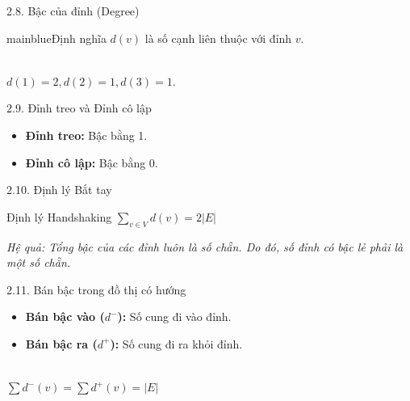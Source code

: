 \documentclass[10pt, xcolor={dvipsnames}]{beamer}
\begin{document}
\begin{frame}{2.8. Bậc của đỉnh (Degree)}
    \begin{detailbox}{mainblue}{Định nghĩa}
        $d(v)$ là số cạnh liên thuộc với đỉnh $v$.
    \end{detailbox}
    \centering
    \\ $d(1)=2, d(2)=1, d(3)=1$.
\end{frame}

\begin{frame}{2.9. Đỉnh treo và Đỉnh cô lập}
    \begin{itemize}
        \item \textbf{Đỉnh treo:} Bậc bằng 1.
        \item \textbf{Đỉnh cô lập:} Bậc bằng 0.
    \end{itemize}
    \centering
\end{frame}

\begin{frame}{2.10. Định lý Bắt tay}
    \begin{alertblock}{Định lý Handshaking}
        $\sum_{v \in V} d(v) = 2|E|$
    \end{alertblock}
    \vspace{0.3cm}
    \textit{Hệ quả: Tổng bậc của các đỉnh luôn là số chẵn. Do đó, số đỉnh có bậc lẻ phải là một số chẵn.}
\end{frame}

\begin{frame}{2.11. Bán bậc trong đồ thị có hướng}
    \begin{itemize}
        \item \textbf{Bán bậc vào ($d^-$):} Số cung đi vào đỉnh.
        \item \textbf{Bán bậc ra ($d^+$):} Số cung đi ra khỏi đỉnh.
    \end{itemize}
    \centering
    \\ $\sum d^-(v) = \sum d^+(v) = |E|$
\end{frame}
\end{document}
